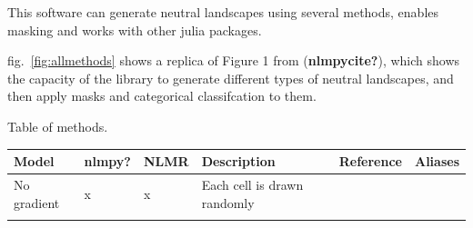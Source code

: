 \documentclass[11pt]{article}
\begin{document}
This software can generate neutral landscapes using several methods,
enables masking and works with other julia packages.

fig.~\ref{fig:allmethods} shows a replica of Figure 1 from
(\textbf{nlmpycite?}), which shows the capacity of the library to
generate different types of neutral landscapes, and then apply masks and
categorical classifcation to them.

Table of methods.

\begin{longtable}[]{@{}llllll@{}}
\toprule
\begin{minipage}[b]{0.35\columnwidth}\raggedright
Model\strut
\end{minipage} & \begin{minipage}[b]{0.07\columnwidth}\raggedright
nlmpy?\strut
\end{minipage} & \begin{minipage}[b]{0.05\columnwidth}\raggedright
NLMR\strut
\end{minipage} & \begin{minipage}[b]{0.33\columnwidth}\raggedright
Description\strut
\end{minipage} & \begin{minipage}[b]{0.02\columnwidth}\raggedright
Reference\strut
\end{minipage} & \begin{minipage}[b]{0.02\columnwidth}\raggedright
Aliases\strut
\end{minipage}\tabularnewline
\midrule
\endhead
\begin{minipage}[t]{0.35\columnwidth}\raggedright
No gradient\strut
\end{minipage} & \begin{minipage}[t]{0.07\columnwidth}\raggedright
x\strut
\end{minipage} & \begin{minipage}[t]{0.05\columnwidth}\raggedright
x\strut
\end{minipage} & \begin{minipage}[t]{0.33\columnwidth}\raggedright
Each cell is drawn randomly\strut
\end{minipage} & \begin{minipage}[t]{0.02\columnwidth}\raggedright
\strut
\end{minipage} & \begin{minipage}[t]{0.02\columnwidth}\raggedright
\strut
\end{minipage}\tabularnewline
\begin{minipage}[t]{0.35\columnwidth}\raggedright

\end{minipage}
\end{longtable}
\end{document}

